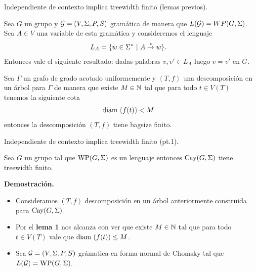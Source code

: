 \documentclass[aspectratio=169, 11pt]{beamer}
\begin{document}
	
	\begin{frame}[fragile]{Independiente de contexto implica treewidth finito (lemas previos).}
		\begin{lema}[1]
			Sea $G$ un grupo \ic{} y ${\cal G} = (V, \Sigma, P, S)$ gramática \ic{}  de manera que $L({\cal G}) = WP(G,\Sigma)$.
			Sea $A \in V$ una variable de esta gramática y consideremos el lenguaje
			\[
			L_A = \{ w \in \Sigma^*  \ | \ A \overset{*}{\to} w  \}.
			\]
			Entonces vale el siguiente resultado:
			dadas palabras $v,v' \in L_{A}$ luego $v = v'$ en $G$.
		\end{lema}

		\begin{lema}[2]
			Sea $\Gamma$ un grafo de grado acotado uniformemente y 
			$(T,f)$ una descomposición en un árbol para $\Gamma$ de manera que existe $M \in \mathbb{N}$ tal que para todo $t \in V(T)$ tenemos la siguiente cota
			\[
				  \text{diam}\ (f(t)) < M
			\]   
			entonces la descomposición $(T,f)$ tiene bagsize finito.
		\end{lema}
	\end{frame}

	\begin{frame}[fragile]{Independiente de contexto implica treewidth finito (pt.1).}
		\begin{teo}
			Sea $G$ un grupo tal que $\text{WP}(G, \Sigma)$ es un lenguaje \ic{} entonces $\text{Cay}(G, \Sigma)$ tiene treewidth finito.
		\end{teo}
		\textbf{Demostración.}

			\begin{itemize}
				\item 
					Consideramos $(T,f)$  descomposición en un árbol anteriormente construida para $\text{Cay}(G, \Sigma)$.
				\item 
					Por el \textbf{lema  1} nos alcanza con ver que existe $M \in \mathbb{N}$ tal que para todo $t \in V(T)$ vale que $\text{diam}\ (f(t)) \le M$.
				\item 
					Sea ${\cal G} = (V, \Sigma, P, S)$ grámatica \ic{} en forma normal de Chomsky tal que $L({\cal G}) = \text{WP}(G, \Sigma)$.
			\end{itemize}
	\end{frame}
\end{document}
